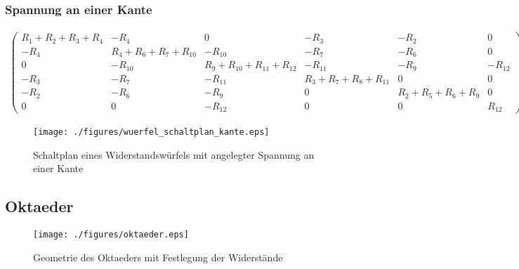\documentclass[10pt,a4paper]{article}
\begin{document}
\begin{landscape}
\subsubsection{Spannung an einer Kante}
\begin{align}
\begin{pmatrix}
R_1+R_2+R_3+R_4 &  -R_4  &  0  &  -R_3  &  -R_2  &  0  \\ 
-R_4 & R_4+R_6+R_7+R_{10} & -R_{10} & -R_7 & -R_6 & 0 \\ 
 0  & -R_{10} & R_9+R_{10}+R_{11}+R_{12} & -R_{11} & -R_9 & -R_{12} \\ 
-R_3 & -R_7 & -R_11 & R_3+R_7+R_8+R_{11} & 0 & 0 \\ 
-R_2 & -R_6 & -R_9 & 0 & R_2+R_5+R_6+R_9 & 0 \\ 
 0  & 0 & -R_{12} &  0  & 0 & R_{12}
\end{pmatrix}
\begin{pmatrix}
I_1\\I_2\\I_3\\I_4\\I_5\\I_{ges}
\end{pmatrix}
=
\begin{pmatrix}
0\\0\\0\\0\\0\\U
\end{pmatrix}
\label{eqn:querfel_kante}
\end{align}
\thispagestyle{empty}
\begin{figure}[htbp!]
\centering
\texttt{[image: ./figures/wuerfel\_schaltplan\_kante.eps]}
\caption{Schaltplan eines Widerstandswürfels mit angelegter Spannung an einer Kante}
\label{fig:wuerfel_schaltplan_kante}
\end{figure}
\subsection{Oktaeder}
\begin{figure}[htbp!]
\centering
\texttt{[image: ./figures/oktaeder.eps]}
\caption{Geometrie des Oktaeders mit Festlegung der Widerstände}
\label{fig:geometrie_oktaeder}
\end{figure}

\end{landscape}
\end{document}
